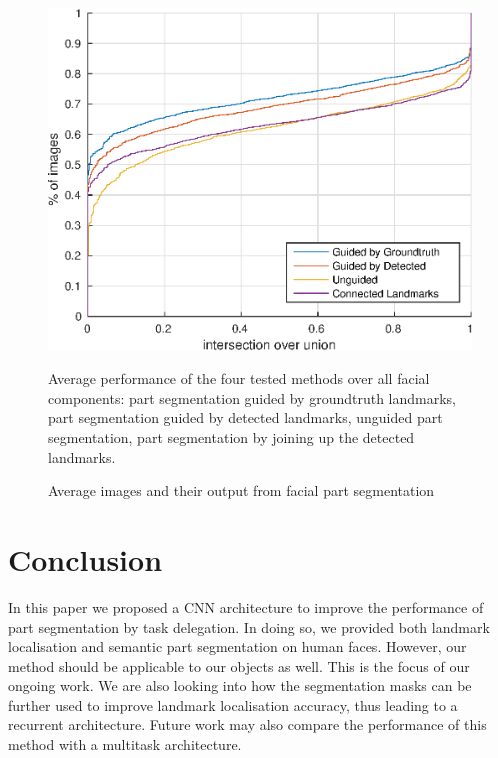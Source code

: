 \begin{figure}
\centering
\includegraphics[width=0.6\linewidth]{figs/all.eps}
\caption{Average images and their output from facial part
  segmentation}{Average performance of the four tested methods over
  all facial components: part segmentation guided by groundtruth
  landmarks, part segmentation guided by detected landmarks, unguided
  part segmentation, part segmentation by joining up the detected
  landmarks.}
\label{fig:all}
\end{figure}


\section{Conclusion}

In this paper we proposed a CNN architecture to improve the
performance of part segmentation by task delegation. In doing so, we
provided both landmark localisation and semantic part segmentation on
human faces. However, our method should be applicable to our objects
as well. This is the focus of our ongoing work. We are also looking
into how the segmentation masks can be further used to improve
landmark localisation accuracy, thus leading to a recurrent
architecture. Future work may also compare the performance of this
method with a multitask architecture.

